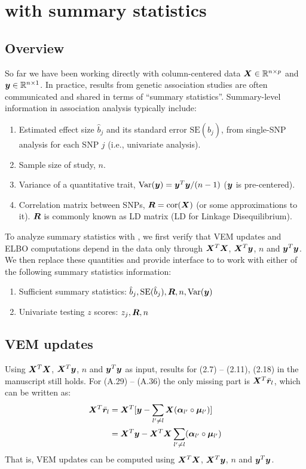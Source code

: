 \section{\susie with summary statistics}
\subsection{Overview}
So far we have been working directly with column-centered data $\bm X\in \mathbb{R}^{n\times p}$ and $\bm y\in\mathbb{R}^{n\times 1}$. In practice, results from genetic association studies are often communicated and shared in terms of ``summary statistics''. Summary-level information in association analysis typically include:
\begin{enumerate}
\item Estimated effect size $\hat{b}_j$ and its standard error $\text{SE}(\hat{b}_j)$, from single-SNP analysis for each SNP $j$ (i.e., univariate analysis). 
\item Sample size of study, $n$.
\item Variance of a quantitative trait, $\text{Var}(\bm y) = \bm y^T\bm y/(n-1)$ ($\bm y$ is pre-centered).
\item Correlation matrix between SNPs, $\bm R=\text{cor}(\bm X)$ (or some approximations to it). $\bm R$ is commonly known as LD matrix (LD for Linkage Disequilibrium).
\end{enumerate}
To analyze summary statistics with \susie, we first verify that \susie VEM updates and ELBO computations depend in the data only through $\bm X^T\bm X$, $\bm X^T\bm y$, $n$ and $\bm y^T\bm y$. We then replace these quantities and provide interface to \susie to work with either of the following summary statistics information:
\begin{enumerate}
    \item Sufficient summary statistics: $\hat{b}_j, \text{SE}(\hat{b}_j), \bm R, n, \text{Var}(\bm y)$
    \item Univariate testing $z$ scores: $z_j, \bm R, n$
\end{enumerate}

\subsection{VEM updates} \label{sec:vem_update_ss}
Using $\bm X^T\bm X$, $\bm X^T\bm y$, $n$ and $\bm y^T\bm y$ as input, results for (2.7) -- (2.11), (2.18) in the manuscript still holds. For (A.29) -- (A.36) the only missing part is $\bm X^T\bar{\bm r}_l$, which can be written as:
\begin{align}
\bm X^T\bar{\bm r}_l &= \bm X^T[\bm y - \sum_{l'\neq l}\bm X (\bm \alpha_{l'} \circ \bm \mu_{l'})] \\
&= \bm X^T\bm y - \bm X^T\bm X\sum_{l'\neq l}(\bm \alpha_{l'} \circ \bm \mu_{l'})
\end{align}
That is, VEM updates can be computed using $\bm X^T\bm X$, $\bm X^T\bm y$, $n$ and $\bm y^T\bm y$.

